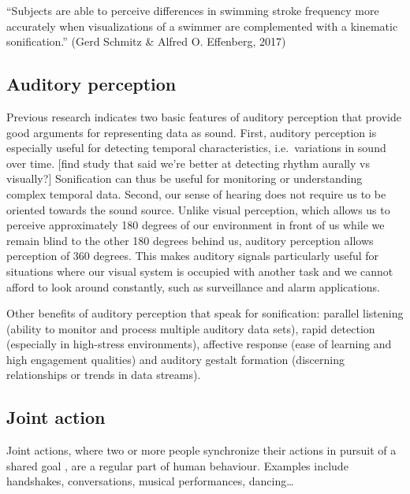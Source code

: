 \documentclass[10pt,a4paper,onecolumn]{article}
\begin{document}
``Subjects are able to perceive differences in swimming stroke frequency more accurately when visualizations of a swimmer are complemented with a kinematic sonification.'' (Gerd Schmitz \& Alfred O. Effenberg, 2017)

\hypertarget{auditory-perception}{%
\subsection{Auditory perception}\label{auditory-perception}}

Previous research indicates two basic features of auditory perception that provide good arguments for representing data as sound. First, auditory perception is especially useful for detecting temporal characteristics, i.e.~variations in sound over time. {[}find study that said we're better at detecting rhythm aurally vs visually?{]} Sonification can thus be useful for monitoring or understanding complex temporal data. Second, our sense of hearing does not require us to be oriented towards the sound source. Unlike visual perception, which allows us to perceive approximately 180 degrees of our environment in front of us while we remain blind to the other 180 degrees behind us, auditory perception allows perception of 360 degrees. This makes auditory signals particularly useful for situations where our visual system is occupied with another task and we cannot afford to look around constantly, such as surveillance and alarm applications. \autocite{kramerSonificationReportStatus1999}

Other benefits of auditory perception that speak for sonification: parallel listening (ability to monitor and process multiple auditory data sets), rapid detection (especially in high-stress environments), affective response (ease of learning and high engagement qualities) and auditory gestalt formation (discerning relationships or trends in data streams). \autocite{kramerSonificationReportStatus1999}

\hypertarget{joint-action}{%
\subsection{Joint action}\label{joint-action}}

Joint actions, where two or more people synchronize their actions in pursuit of a shared goal \autocite{knoblichPsychologicalResearchJoint2011}, are a regular part of human behaviour. Examples include handshakes, conversations, musical performances, dancing\ldots{}
\end{document}
